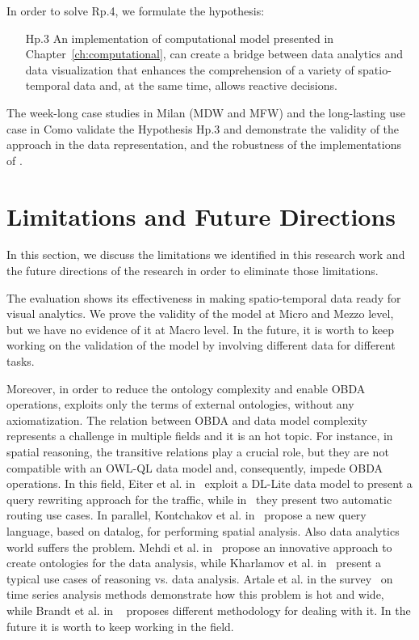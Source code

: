 In order to solve \textsf{Rp.4}, we formulate the hypothesis:
\begin{itemize}[leftmargin=42pt]
\item[\textsf{Hp.3}] An implementation of \river{} computational model presented in Chapter~\ref{ch:computational}, can create a bridge between data analytics and data visualization that enhances the comprehension of a variety of spatio-temporal data and, at the same time, allows reactive decisions.
\end{itemize}

The week-long case studies in Milan (MDW and MFW) and the long-lasting use case in Como validate the Hypothesis \textsf{Hp.3} and demonstrate the validity of the \frappe{} approach in the data representation, and the robustness of the implementations of \river{}.

\section{Limitations and Future Directions}
In this section, we discuss the limitations we identified in this research work and the future directions of the research in order to eliminate those limitations.

The \frappe{} evaluation shows its effectiveness in making spatio-temporal data ready for visual analytics.
We prove the validity of the model at Micro and Mezzo level, but we have no evidence of it at Macro level.
In the future, it is worth to keep working on the validation of the model by involving different data for different tasks.

Moreover, in order to reduce the ontology complexity and enable OBDA operations, \frappe{} exploits only the terms of external ontologies, without any axiomatization.
The relation between OBDA and data model complexity represents a challenge in multiple fields and it is an hot topic.
For instance, in spatial reasoning, the transitive relations play a crucial role, but they are not compatible with an OWL-QL data model and, consequently, impede OBDA operations.
In this field, Eiter et al. in~\cite{DBLP:conf/esws/EiterPS17} exploit a DL-Lite data model to present a query rewriting approach for the traffic, while in~\cite{DBLP:journals/itsr/EiterKPRSS16} they present two automatic routing use cases. In parallel, Kontchakov et al. in~\cite{DBLP:conf/ijcai/KontchakovPPRZ16} propose a new query language, based on datalog, for performing spatial analysis.
Also data analytics world suffers the problem. Mehdi et al. in~\cite{DBLP:conf/ijcai/MehdiBRR16} propose an innovative approach to create ontologies for the data analysis, while Kharlamov et al. in~\cite{DBLP:journals/ws/KharlamovMMNORS17} present a typical use cases of reasoning vs. data analysis.
Artale et al. in the survey~\cite{DBLP:conf/dlog/BienvenuKKPZ16} on time series analysis methods demonstrate how this problem is hot and wide, while Brandt et al. in ~\cite{DBLP:conf/aaai/BrandtKKRXZ17} proposes different methodology for dealing with it.
In the future it is worth to keep working in the field.

